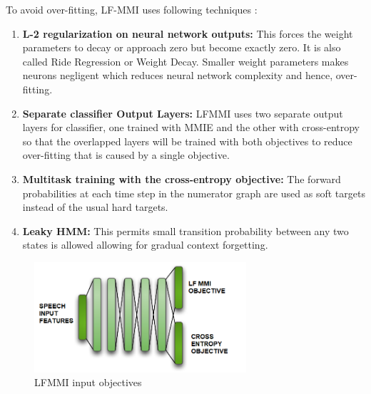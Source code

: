 To avoid over-fitting, LF-MMI uses following techniques \cite{raj_experiments_nodate}:
\begin{enumerate}
    \item \textbf{L-2 regularization on neural network outputs:} This forces the weight parameters to decay or approach zero but become exactly zero. It is also called Ride Regression or Weight Decay. Smaller weight parameters makes neurons negligent which reduces neural network complexity and hence, over-fitting. 
    \item \textbf{Separate classifier Output Layers:} LFMMI uses two separate output layers for classifier, one trained with MMIE and the other with cross-entropy so that the overlapped layers will be trained with both objectives to reduce over-fitting that is caused by a single objective.
    \item \textbf{Multitask training with the cross-entropy objective:} The forward probabilities at each time step in the numerator graph are used as soft targets instead of the usual hard targets.
    \item \textbf{Leaky HMM:} This permits small transition probability between any two states is allowed allowing for gradual context forgetting. %
\end{enumerate}

\begin{figure}
    \centering
    \includegraphics[width=0.7\textwidth]{img/LFMMI-crossent.png}
    \caption{LFMMI input objectives}
    \label{fig:LFMMI-INPUT}
\end{figure}



